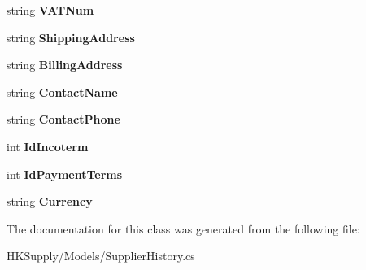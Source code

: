 \begin{DoxyCompactItemize}
string {\bfseries V\+A\+T\+Num}
\item 
\mbox{\label{class_h_k_supply_1_1_models_1_1_supplier_history_a43efb7fddc721c13e629ac8f890f85a5}} 
string {\bfseries Shipping\+Address}
\item 
\mbox{\label{class_h_k_supply_1_1_models_1_1_supplier_history_ae2f5fdcd9278c119fceed2a9ba9da184}} 
string {\bfseries Billing\+Address}
\item 
\mbox{\label{class_h_k_supply_1_1_models_1_1_supplier_history_a267b20071a81f3002cf8d35efb0caf95}} 
string {\bfseries Contact\+Name}
\item 
\mbox{\label{class_h_k_supply_1_1_models_1_1_supplier_history_a02ad40069617500a5e249ae6b0086d1f}} 
string {\bfseries Contact\+Phone}
\item 
\mbox{\label{class_h_k_supply_1_1_models_1_1_supplier_history_a86e2d99cc0c9498a7cae7e7f8ae1783b}} 
int {\bfseries Id\+Incoterm}
\item 
\mbox{\label{class_h_k_supply_1_1_models_1_1_supplier_history_a7e36f010d3c4546d0efffe45a9388718}} 
int {\bfseries Id\+Payment\+Terms}
\item 
\mbox{\label{class_h_k_supply_1_1_models_1_1_supplier_history_a68540cf27c3fbe004e566b3567975306}} 
string {\bfseries Currency}
\end{DoxyCompactItemize}


The documentation for this class was generated from the following file\+:\begin{DoxyCompactItemize}
\item 
H\+K\+Supply/\+Models/Supplier\+History.\+cs\end{DoxyCompactItemize}
